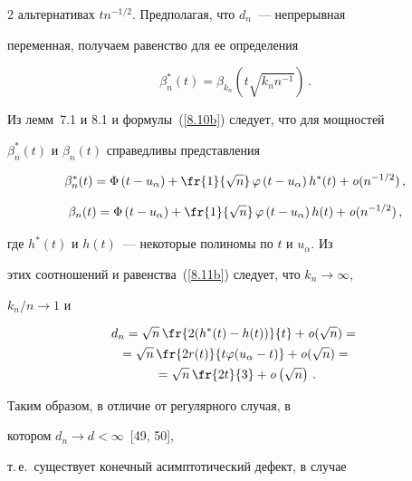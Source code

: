 \begin{multicols}{2}
альтернативах $tn^{-1/2}$. Предполагая, что $d_n$~--- непрерывная


переменная, получаем равенство для ее определения


\begin{equation}


\beta_n^*(t)=\beta_{k_n}(t\sqrt{k_nn^{-1}})\,.


\label{8.11b}


\end{equation}


Из лемм~7.1 и 8.1 и формулы~(\ref{8.10b}) следует, что для мощностей


$\beta_n^*(t)$ и $\beta_n(t)$ справедливы представления


$$


\beta_n^*(t)=\Phi\left (


t-u_\alpha\right )+ \fr{1}{\sqrt n}\,\varphi\left (


t-u_{\alpha}\right ) h^*(t)+{\it o}(n^{-1/2})\,,


$$


$$


\beta_n(t)=\Phi\left (


t-u_\alpha\right )+ \fr{1}{\sqrt n}\,\varphi\left (


t-u_{\alpha}\right ) h(t)+{\it o}(n^{-1/2})\,,


$$


где $h^*(t)$ и $h(t)$~--- некоторые полиномы по $t$ и $u_{\alpha}$. Из


этих соотношений и равенства~(\ref{8.11b}) следует, что $k_n \to \infty$,


$k_n/n \to 1$ и


\begin{multline}


d_n=\sqrt{n}\,\fr{2(h^*(t)-h(t))}{t}+{\it o}(\sqrt n)= {}\\


{}=\sqrt{n}\, \fr{2r(t)}{t\varphi(u_{\alpha}-t)}+{\it o}(\sqrt n)= {}\\


{}= \sqrt {n}\, \fr{2t}{3}+{\it o}\left(\sqrt n\right)\,.


\label{8.12b}


\end{multline}


Таким образом, в отличие от регулярного случая, в


котором $d_n \to d<\infty$~[49, 50],


т.\,е.\ существует конечный асимптотический дефект,  в случае



\end{multicols}

